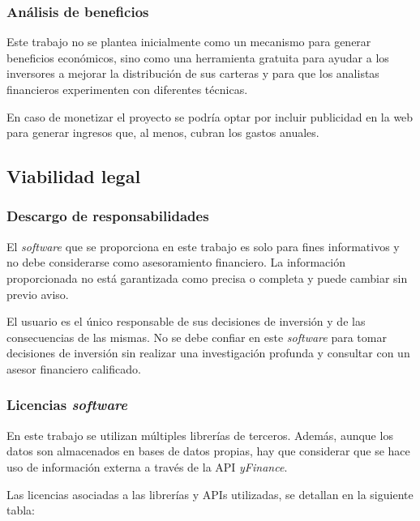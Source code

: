 \subsubsection{Análisis de beneficios}

Este trabajo no se plantea inicialmente como un mecanismo para generar beneficios económicos, sino como una herramienta gratuita para ayudar a los inversores a mejorar la distribución de sus carteras y para que los analistas financieros experimenten con diferentes técnicas. 

En caso de monetizar el proyecto se podría optar por incluir publicidad en la web para generar ingresos que, al menos, cubran los gastos anuales. 

\subsection{Viabilidad legal}

\subsubsection{Descargo de responsabilidades}

El \emph{software} que se proporciona en este trabajo es solo para fines informativos y no debe considerarse como asesoramiento financiero. La información proporcionada no está garantizada como precisa o completa y puede cambiar sin previo aviso.

El usuario es el único responsable de sus decisiones de inversión y de las consecuencias de las mismas. No se debe confiar en este \emph{software} para tomar decisiones de inversión sin realizar una investigación profunda y consultar con un asesor financiero calificado.

\subsubsection{Licencias \emph{software}}

En este trabajo se utilizan múltiples librerías de terceros. Además, aunque los datos son almacenados en bases de datos propias, hay que considerar que se hace uso de información externa a través de la API \emph{yFinance}. 

Las licencias asociadas a las librerías y APIs utilizadas, se detallan en la siguiente tabla:

